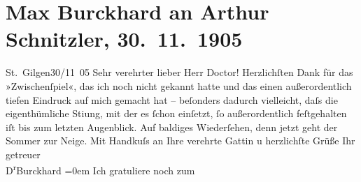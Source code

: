 

         
         \newcommand{\erwaehntePersonen}{Personen: Olga Schnitzler}
         \newcommand{\erwaehnteOrte}{Orte: Berlin, Deutsches Theater Berlin, St. Gilgen, Wien}
         \newcommand{\erwaehnteWerke}{Werke: Zwischenspiel. Komödie in drei Akten}
               \section[Max Burckhard an Arthur Schnitzler, 30. 11. 1905]{ Max Burckhard an Arthur Schnitzler, 30. 11. 1905}\nopagebreak{}\rehead{ }\begin{ledgroupsized}[t]{13cm}\normalsize\beginnumbering \toendnotes[C]{\smallbreak\pagebreak[2]} 
\toendnotes[C]{\smallbreak}\pstart
           \raggedleft{}{\pb}St. Gilgen30/11 05\pend
           \pstart{}Sehr verehrter lieber Herr Doctor!\pend\pstart
           Herzlichſten Dank für das »Zwischenſpiel«, das
                    ich noch nicht gekannt hatte und das einen außerordentlich tiefen Eindruck auf
                    mich gemacht hat – beſonders dadurch vielleicht, daſs die eigenthümliche Sti{\geminationm}ung, {\pb}mit der es ſchon einſetzt, ſo außerordentlich feſtgehalten iſt bis zum letzten
                    Augenblick.\pend
           \pstart
           Auf baldiges Wiederſehen, denn jetzt geht der Sommer zur Neige.\pend
           \pstart
           Mit Handkuſs an Ihre verehrte Gattin u herzlichſte Grüße\pend
           \pstart
           Ihr getreuer{\\[\baselineskip]}\spacefill\mbox{D\textsuperscript{r}Burckhard}\pend
           \leftskip=0em{}\pstart
           \noindent{}Ich gratuliere noch zum \label{K_L01568_1v}
\end{ledgroupsized}
